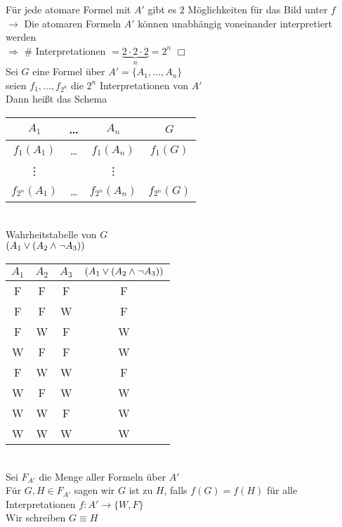 \beweis{}
Für jede atomare Formel mit $A'$ gibt es $2$ Möglichkeiten für das Bild unter $f$\\
$\rightarrow$ Die atomaren Formeln $A'$ können unabhängig voneinander interpretiert werden\\
$\Rightarrow$ $\#$ Interpretationen $=\underbrace{2 \cdot 2 \cdot 2}_n = 2^n$ \hspace{1cm}\ensuremath{\Box}\\

Sei $G$ eine Formel über $A' = \{A_1, …, A_n \}$\\
seien $f_1, …, f_{2^n}$ die $2^n$ Interpretationen von $A'$\\
Dann heißt das Schema\\
\begin{tabular}{c|c|c|c}
$A_1$ & … & $A_n$ & $G$\\
\hline
$f_1 (A_1)$ & … & $f_1 (A_n)$ & $f_1 (G)$\\
\vdots & & \vdots & \\
$f_{2^n} (A_1)$ & … & $f_{2^n} (A_n)$ & $f_{2^n} (G)$
\end{tabular}\\
Wahrheitstabelle von $G$\\

\beispiel{}
$(A_1 \vee (A_2 \wedge \neg A_3))$\\

\begin{tabular}{c|c|c|c}
$A_1$ & $A_2$ & $A_3$ & $(A_1 \vee (A_2 \wedge \neg A_3))$\\
\hline
F & F & F & F\\
F & F & W & F\\
F & W & F & W\\
W & F & F & W\\
F & W & W & F\\
W & F & W & W\\
W & W & F & W\\
W & W & W & W\\
\end{tabular}\\
    
Sei $F_{A'}$ die Menge aller Formeln über $A'$\\
Für $G, H \in F_{A'}$ sagen wir $G$ ist  zu $H$, falls $f(G) = f(H)$ für alle Interpretationen $f:A' \rightarrow \{W,F\}$\\
Wir schreiben $G \equiv H$\\